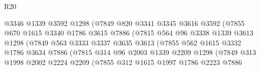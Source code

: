 \begin{lexlean}{R20}
\begin{coremodule}
                                @3346
                                @1339
                                @3592
                                @1298
                                (@7849
                                  @820
                                  @3341
                                  @3345
                                  @3616
                                  @3592
                                  (@7855
                                    @670
                                    @1615
                                    @3340
                                    @1786
                                    @3615
                                    @7886
                                    (@7815
                                      @564
                                      @96
                                      @3338
                                      @1339
                                      @3613
                                      @1298
                                      (@7849
                                        @563
                                        @3333
                                        @3337
                                        @3635
                                        @3613
                                        (@7855
                                          @562
                                          @1615
                                          @3332
                                          @1786
                                          @3634
                                          @7886
                                          (@7815
                                            @314
                                            @96
                                            @2003
                                            @1339
                                            @2209
                                            @1298
                                            (@7849
                                              @313
                                              @1998
                                              @2002
                                              @2224
                                              @2209
                                              (@7855
                                                @312
                                                @1615
                                                @1997
                                                @1786
                                                @2223
                                                @7886

\end{coremodule}
\end{lexlean}
